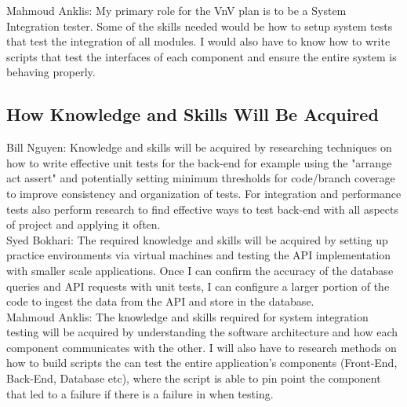 \documentclass[12pt, titlepage]{article}
\begin{document}
\noindent Mahmoud Anklis: My primary role for the VnV plan is to be a System Integration tester. Some of the skills needed would be how to setup system tests that test the integration of all modules. I would also have to know how to write scripts that test the interfaces of each component and ensure the entire system is behaving properly.\\

\subsection{How Knowledge and Skills Will Be Acquired}

\noindent Bill Nguyen: Knowledge and skills will be acquired by researching techniques on how to write effective unit tests for the back-end for example using the "arrange act assert" and potentially setting minimum thresholds for code/branch coverage to improve consistency and organization of tests. For integration and performance tests also perform research to find effective ways to test back-end with all aspects of project and applying it often.\\

\noindent Syed Bokhari: The required knowledge and skills will be acquired by setting up practice environments via virtual machines and testing the API implementation with smaller scale applications. Once I can confirm the accuracy of the database queries and API requests with unit tests, I can configure a larger portion of the code to ingest the data from the API and store in the database.\\

\noindent Mahmoud Anklis: The  knowledge and skills required for system integration testing will be acquired by understanding the software architecture and how each component communicates with the other. I will also have to research methods on how to build scripts the can test the entire application's components (Front-End, Back-End, Database etc), where the script is able to pin point the component that led to a failure if there is a failure in when testing.\\
\end{document}
